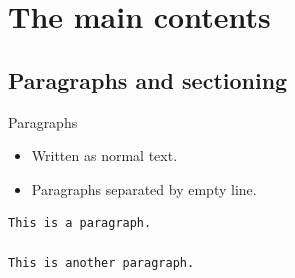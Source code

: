 %



\section{The main contents}

\subsection{Paragraphs and sectioning}

\begin{frame}[fragile]
  \begin{block}{Paragraphs}
    \begin{itemize}
      \item Written as normal text.

      \item Paragraphs separated by empty line.
    \end{itemize}
  \end{block}

  \pause

  \begin{example}
  \begin{lstlisting}
This is a paragraph.

This is another paragraph.
  \end{lstlisting}
  \end{example}
\end{frame}

